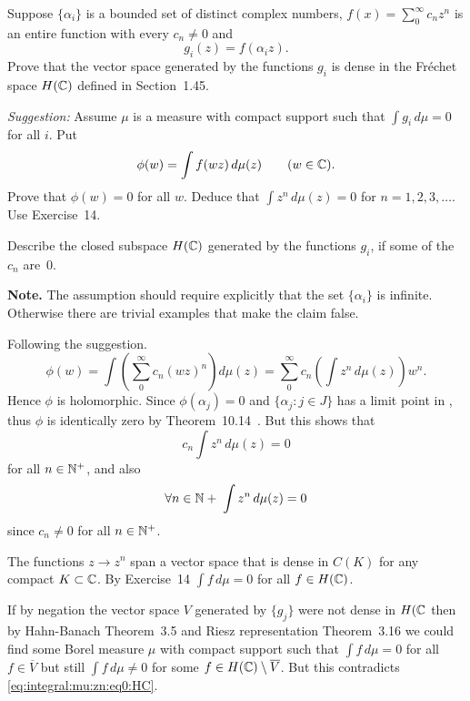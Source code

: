 \begin{enumerate}
\begin{excopy}
Suppose \(\{\alpha_i\}\) is a bounded set of distinct complex numbers,
\(f(x) = \sum_0^\infty c_n z^n\) is an entire function with every \(c_n\neq 0\)
and
\begin{equation*}
g_i(z) = f(\alpha_iz).
\end{equation*}
Prove that the vector space generated by the functions \(g_i\) is dense in
the Fr\'echet space \(H(\mathbb{C})\) defined in Section~1.45.

\emph{Suggestion:} Assume \(\mu\) is a measure with compact support such that
\(\int g_i\,d\mu = 0\) for all $i$. Put
\begin{equation*}
\phi(w) = \int f(wz)\,d\mu(z) \qquad (w\in\mathbb{C}).
\end{equation*}
Prove that \(\phi(w) = 0\) for all $w$. Deduce that \(\int z^n\,d\mu(z) = 0\)
for \(n=1,2,3,\ldots\). Use Exercise~14.

Describe the closed subspace \(H(\mathbb{C})\) generated by the functions \(g_i\),
if some of the \(c_n\) are~$0$.
\end{excopy}

\textbf{Note.} The assumption should require explicitly that the 
set  \(\{\alpha_i\}\) is infinite. Otherwise there are trivial examples
that make the claim false.

Following the suggestion.
\begin{equation*}
\phi(w)
= \int \left(\sum_0^\infty c_n (wz)^n\right)d\mu(z)
= \sum_0^\infty c_n  \left(\int z^n\,d\mu(z)\right) w^n.
\end{equation*}
Hence \(\phi\) is holomorphic.
Since \(\phi(\alpha_j) = 0\) and \(\{\alpha_j:j\in J\}\)
has a limit point in \C,
thus \(\phi\) is identically zero by Theorem~10.14~\cite{RudinRCA80}.
But this shows that 
\begin{equation*}
c_n  \int z^n\,d\mu(z) = 0
\end{equation*}
for all \(n\in \mathbb{N}^+\),
and also
\begin{equation} \label{eq:integral:mu:zn:eq0:HC}
\forall n\in\mathbb{N}+\; \int z^n\,d\mu(z) = 0
\end{equation}
 since \(c_n \neq 0\) for all \(n\in \mathbb{N}^+\).

The functions \(z\to z^n\) span a vector space that is dense in
\(C(K)\) for any compact \(K \subset \mathbb{C}\).
By Exercise~14 \(\int f\,d\mu = 0\) for all \(f \in H(\mathbb{C})\).

If by negation the vector space $V$ generated by \(\{g_j\}\)
were not dense in \(H(\mathbb{C}\) then by Hahn-Banach Theorem~3.5
and Riesz representation Theorem~3.16 \cite{RudinRCA80}
we could find some Borel measure \(\mu\) with compact support
such that  \(\int f\,d\mu = 0\) for all \(f\in \overline{V}\)
but still \(\int f\,d\mu \neq 0\)
for some \(f \in H(\mathbb{C}) \setminus \overline{V}\).
But this contradicts \eqref{eq:integral:mu:zn:eq0:HC}.


\end{enumerate}
